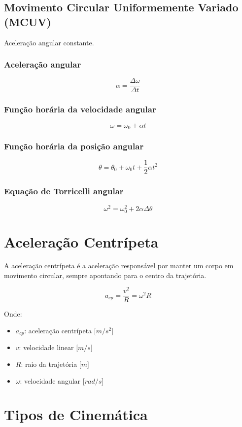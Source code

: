 \documentclass[a4paper,12pt]{article}
\begin{document}
\subsection{Movimento Circular Uniformemente Variado (MCUV)}

Aceleração angular constante.

\subsubsection{Aceleração angular}
\[
\alpha = \frac{\Delta \omega}{\Delta t}
\]

\subsubsection{Função horária da velocidade angular}
\[
\omega = \omega_0 + \alpha t
\]

\subsubsection{Função horária da posição angular}
\[
\theta = \theta_0 + \omega_0 t + \frac{1}{2}\alpha t^2
\]

\subsubsection{Equação de Torricelli angular}
\[
\omega^2 = \omega_0^2 + 2\alpha \Delta \theta
\]

\section{Aceleração Centrípeta}

A aceleração centrípeta é a aceleração responsável por manter um corpo em movimento circular, sempre apontando para o centro da trajetória.

\[
a_{cp} = \frac{v^2}{R} = \omega^2 R
\]

Onde:
\begin{itemize}
    \item $a_{cp}$: aceleração centrípeta [$m/s^2$]
    \item $v$: velocidade linear [$m/s$]
    \item $R$: raio da trajetória [$m$]
    \item $\omega$: velocidade angular [$rad/s$]
\end{itemize}

\section{Tipos de Cinemática}
\end{document}
